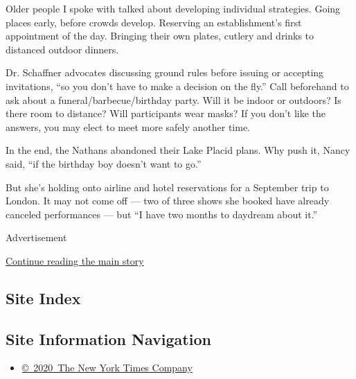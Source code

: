 Older people I spoke with talked about developing individual strategies.
Going places early, before crowds develop. Reserving an establishment's
first appointment of the day. Bringing their own plates, cutlery and
drinks to distanced outdoor dinners.

Dr. Schaffner advocates discussing ground rules before issuing or
accepting invitations, ``so you don't have to make a decision on the
fly.'' Call beforehand to ask about a funeral/barbecue/birthday party.
Will it be indoor or outdoors? Is there room to distance? Will
participants wear masks? If you don't like the answers, you may elect to
meet more safely another time.

In the end, the Nathans abandoned their Lake Placid plans. Why push it,
Nancy said, ``if the birthday boy doesn't want to go.''

But she's holding onto airline and hotel reservations for a September
trip to London. It may not come off --- two of three shows she booked
have already canceled performances --- but ``I have two months to
daydream about it.''

Advertisement

\protect\hyperlink{after-bottom}{Continue reading the main story}

\hypertarget{site-index}{%
\subsection{Site Index}\label{site-index}}

\hypertarget{site-information-navigation}{%
\subsection{Site Information
Navigation}\label{site-information-navigation}}

\begin{itemize}
\tightlist
\item
  \href{https://help.nytimes3xbfgragh.onion/hc/en-us/articles/115014792127-Copyright-notice}{©~2020~The
  New York Times Company}
\end{itemize}

